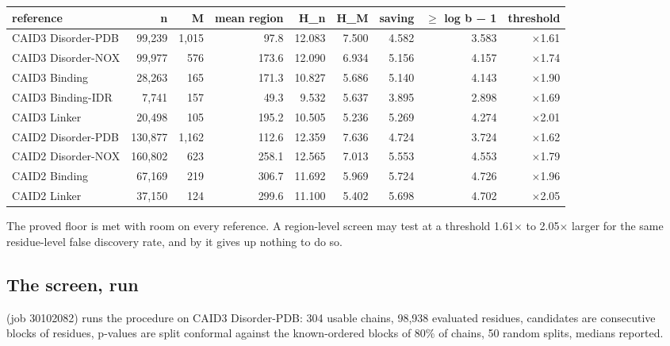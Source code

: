 \begin{center}\footnotesize
\begin{tabular}{lrrrrrrrr}
\toprule
\textbf{reference} & \textbf{n} & \textbf{M} & \textbf{mean region} & \textbf{H\_n} & \textbf{H\_M} & \textbf{saving} & \textbf{$\geq$ log b − 1} & \textbf{threshold} \\
\midrule
CAID3 Disorder-PDB & 99,239 & 1,015 & 97.8 & 12.083 & 7.500 & 4.582 & 3.583 & $\times$1.61 \\
CAID3 Disorder-NOX & 99,977 & 576 & 173.6 & 12.090 & 6.934 & 5.156 & 4.157 & $\times$1.74 \\
CAID3 Binding & 28,263 & 165 & 171.3 & 10.827 & 5.686 & 5.140 & 4.143 & $\times$1.90 \\
CAID3 Binding-IDR & 7,741 & 157 & 49.3 & 9.532 & 5.637 & 3.895 & 2.898 & $\times$1.69 \\
CAID3 Linker & 20,498 & 105 & 195.2 & 10.505 & 5.236 & 5.269 & 4.274 & $\times$2.01 \\
CAID2 Disorder-PDB & 130,877 & 1,162 & 112.6 & 12.359 & 7.636 & 4.724 & 3.724 & $\times$1.62 \\
CAID2 Disorder-NOX & 160,802 & 623 & 258.1 & 12.565 & 7.013 & 5.553 & 4.553 & $\times$1.79 \\
CAID2 Binding & 67,169 & 219 & 306.7 & 11.692 & 5.969 & 5.724 & 4.726 & $\times$1.96 \\
CAID2 Linker & 37,150 & 124 & 299.6 & 11.100 & 5.402 & 5.698 & 4.702 & $\times$2.05 \\
\bottomrule
\end{tabular}
\end{center}

The proved floor  is met with room on every reference. A region-level
screen may test at a threshold 1.61$\times$ to 2.05$\times$ larger for the same residue-level
false discovery rate, and by  it gives up nothing to do so.


\subsection*{The screen, run}

 (job 30102082) runs the procedure on CAID3
Disorder-PDB: 304 usable chains, 98,938 evaluated residues, candidates are
consecutive blocks of  residues, p-values are split conformal against the
known-ordered blocks of 80\% of chains, 50 random splits, medians reported.

